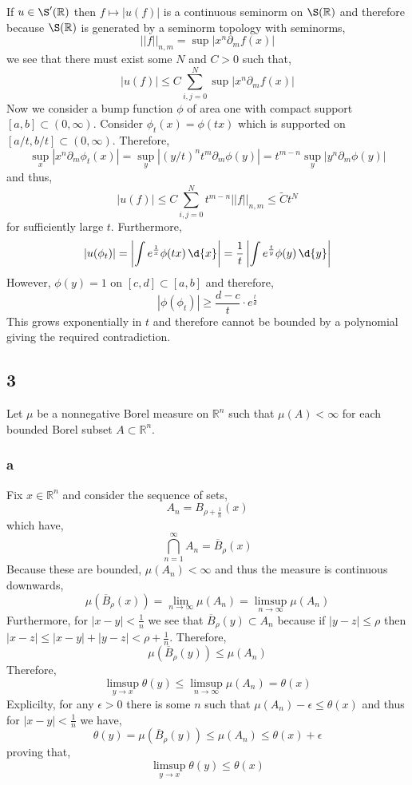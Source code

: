 \documentclass[12pt]{article}
\newcommand{\R}{\mathbb{R}}
\begin{document}
If $u \in \S'(\R)$ then $f \mapsto |u(f)|$ is a continuous seminorm on $\S(\R)$ and therefore because $\S(\R)$ is generated by a seminorm topology with seminorms,
\[ || f ||_{n,m} = \sup | x^n \partial_m f(x) | \]
we see that there must exist some $N$ and $C > 0$ such that,
\[ |u(f)| \le C \sum_{i,j = 0}^{N} \sup |x^n \partial_m f(x) | \]
Now we consider a bump function $\phi$ of area one with compact support $[a,b] \subset (0, \infty)$. Consider $\phi_t(x) = \phi(tx)$ which is supported on $[a/t, b/t] \subset (0, \infty)$. Therefore,
\[ \sup_x |x^n \partial_m \phi_t(x)| = \sup_y |(y/t)^n t^m \partial_m \phi(y) | = t^{m-n} \sup_y |y^n \partial_m \phi(y) | \]
and thus,
\[ |u(f)| \le C \sum_{i,j = 0}^N t^{m-n} || f ||_{n,m} \le \tilde{C} t^N \]
for sufficiently large $t$. Furthermore,
\[ |u(\phi_t)| = \left| \int e^{\frac{1}{x}} \phi(tx) \, \d{x} \right| = \frac{1}{t} \left| \int e^{\frac{t}{y}} \phi(y) \, \d{y} \right| \] 
However, $\phi(y) = 1$ on $[c,d] \subset [a,b]$ and therefore,
\[ | \phi(\phi_t) | \ge \frac{d - c}{t} \cdot e^{\frac{t}{d}} \]
This grows exponentially in $t$ and therefore cannot be bounded by a polynomial giving the required contradiction. 

\subsection{3}

Let $\mu$ be a nonnegative Borel measure on $\R^n$ such that $\mu(A) < \infty$ for each bounded Borel subset $A \subset \R^n$.

\subsubsection{a}

Fix $x \in \R^n$ and consider the sequence of sets,
\[ A_n = B_{\rho + \frac{1}{n}}(x) \]
which have,
\[ \bigcap_{n = 1}^\infty A_n = \overline{B}_\rho(x) \]
Because these are bounded, $\mu(A_n) < \infty$ and thus the measure is continuous downwards,
\[ \mu(\overline{B}_\rho(x)) = \lim_{n \to \infty} \mu(A_n) = \limsup_{n \to \infty} \mu(A_n) \]
Furthermore, for $|x - y| < \frac{1}{n}$ we see that $\overline{B}_\rho(y) \subset A_n$ because if $|y - z| \le \rho$ then $|x - z| \le |x - y| + |y - z| < \rho + \frac{1}{n}$. Therefore,
\[ \mu(\overline{B}_\rho(y)) \le \mu(A_n) \]
Therefore,
\[ \limsup_{y \to x} \theta(y) \le \limsup_{n \to \infty} \mu(A_n) = \theta(x) \]
Explicilty, for any $\epsilon > 0$ there is some $n$ such that $\mu(A_n) - \epsilon \le \theta(x)$ and thus for $|x - y| < \frac{1}{n}$ we have,
\[ \theta(y) = \mu(\overline{B}_\rho(y)) \le \mu(A_n) \le \theta(x) + \epsilon \]
proving that,
\[ \limsup_{y \to x} \theta(y) \le \theta(x) \]
\end{document}
